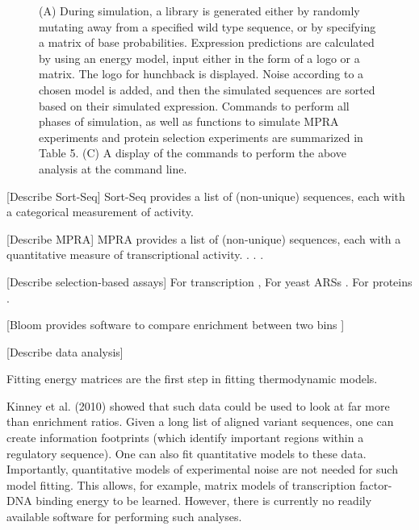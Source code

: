 \documentclass{bmcart}
\begin{document}
%
%
\begin{figure}[h!]
\caption{
(A) During simulation, a library is generated either 
by randomly mutating away from a specified wild type sequence, or by specifying a matrix of base probabilities.
Expression predictions are calculated by using an energy model, input either in the form of
a logo or a matrix. The logo for hunchback is displayed. Noise according to a chosen model
is added, and then the simulated sequences are sorted based on their simulated expression.
Commands to perform all phases of simulation, as well as functions to simulate MPRA 
experiments and protein selection experiments are summarized in Table 5.
(C) A display of the commands to perform the above analysis at the command line.  
}
\end{figure}



[Describe Sort-Seq] Sort-Seq provides a list of (non-unique) sequences, each with a categorical measurement of activity. \cite{Kinney:2010tn}

[Describe MPRA] MPRA provides a list of (non-unique) sequences, each with a quantitative measure of transcriptional activity. \cite{Patwardhan:2009cw}. \cite{Melnikov:2012dw}. \cite{Patwardhan:2012hy}. 

[Describe selection-based assays] For transcription \cite{Findlay:2014ho}, For yeast ARSs \cite{Liachko:2013jc}. For proteins \cite{Fowler:2010gt}. \cite{Fowler:2014gq} 

[Bloom provides software to compare enrichment between two bins \cite{Bloom:2015jz}]

[Describe data analysis] \cite{Atwal:2015wl} \cite{Kinney:2007dh} \cite{Kinney:2010tn} \cite{Kinney:2014ge}

Fitting energy matrices are the first step in fitting thermodynamic models. \cite{Bintu:2005ur,Bintu:2005bn}

Kinney et al. (2010) showed that such data could be used to look at far more than enrichment ratios. Given a long list of aligned variant sequences, one can create information footprints (which identify important regions within a regulatory sequence). One can also fit quantitative models to these data. Importantly, quantitative models of experimental noise are not needed for such model fitting. This allows, for example, matrix models of transcription factor-DNA binding energy to be learned. However, there is currently no readily available software for performing such analyses. 
\end{document}
